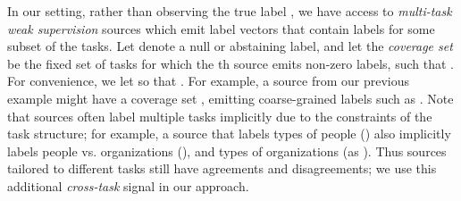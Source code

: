 \documentclass[letterpaper]{article}
\begin{document}
In our setting, rather than observing the true label , we have access to  \textit{multi-task weak supervision} sources  which emit label vectors  that contain labels for some subset of the  tasks.
Let  denote a null or abstaining label, and let the \textit{coverage set}  be the fixed set of tasks for which the th source emits non-zero labels, such that .
For convenience, we let  so that .
For example, a source from our previous example might have a coverage set , emitting coarse-grained labels such as .
Note that sources often label multiple tasks implicitly due to the constraints of the task structure; for example, a source that labels types of people () also implicitly labels people vs. organizations (), and types of organizations (as ).
Thus sources tailored to different tasks still have agreements and disagreements; we use this additional \textit{cross-task} signal in our approach.
\end{document}
